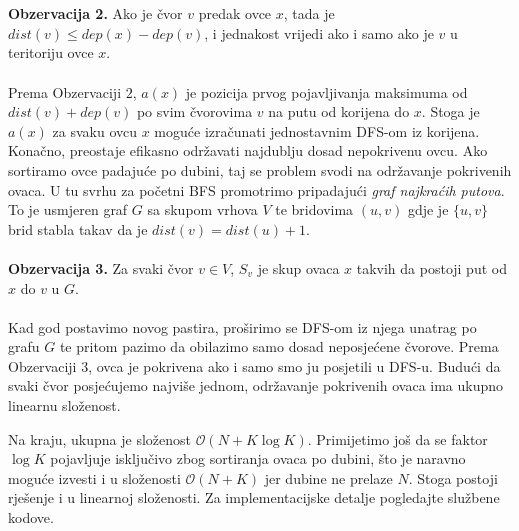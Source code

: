 \\\\
\textbf{Obzervacija 2.} Ako je čvor $v$ predak ovce $x$, tada je $dist(v) \leq dep(x) - dep(v)$, i jednakost vrijedi ako i samo ako je $v$ u teritoriju ovce $x$.
\\\\
Prema Obzervaciji $2$, $a(x)$ je pozicija prvog pojavljivanja maksimuma od $dist(v) + dep(v)$ po svim čvorovima $v$ na putu od korijena do $x$. Stoga je $a(x)$ za svaku ovcu $x$ moguće izračunati jednostavnim DFS-om iz korijena. Konačno, preostaje efikasno održavati najdublju dosad nepokrivenu ovcu. Ako sortiramo ovce padajuće po dubini, taj se problem svodi na održavanje pokrivenih ovaca. U tu svrhu za početni BFS promotrimo pripadajući \emph{graf najkraćih putova}. To je usmjeren graf $G$ sa skupom vrhova $V$ te bridovima $(u, v)$ gdje je $\{u, v\}$ brid stabla takav da je $dist(v) = dist(u) + 1$.
\\\\
\textbf{Obzervacija 3.} Za svaki čvor $v \in V$, $S_v$ je skup ovaca $x$ takvih da postoji put od $x$ do $v$ u $G$. 
\\\\
Kad god postavimo novog pastira, proširimo se DFS-om iz njega unatrag po grafu $G$ te pritom pazimo da obilazimo samo dosad neposjećene čvorove. Prema Obzervaciji 3, ovca je pokrivena ako i samo smo ju posjetili u DFS-u. Budući da svaki čvor posjećujemo najviše jednom, održavanje pokrivenih ovaca ima ukupno linearnu složenost.

Na kraju, ukupna je složenost $\mathcal{O}(N + K\log K)$. Primijetimo još da se faktor $\log K$ pojavljuje isključivo zbog sortiranja ovaca po dubini, što je naravno moguće izvesti i u složenosti $\mathcal{O}(N + K)$ jer dubine ne prelaze $N$. Stoga postoji rješenje i u linearnoj složenosti. Za implementacijske detalje pogledajte službene kodove.